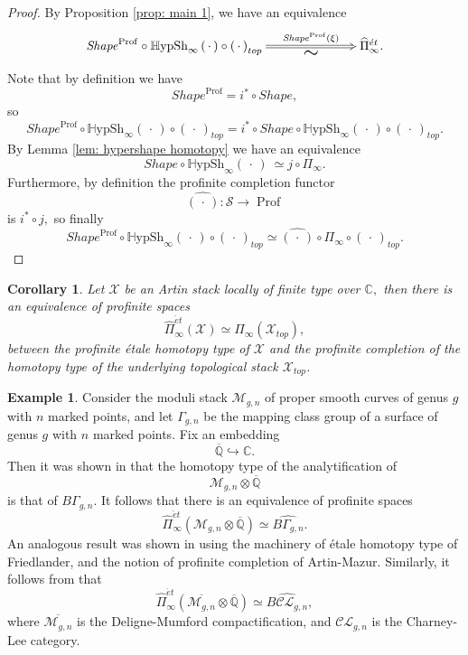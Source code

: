 \documentclass[12pt]{amsart}
\newtheorem{corollary}[dummy]{Corollary}
\theoremstyle{definition}
\newtheorem{example}[dummy]{Example}
\newcommand{\bC}{\mathbb{C}}
\newcommand{\cS}{\mathcal{S}}
\newcommand{\cX}{\mathcal{X}}
\newcommand{\et}{\acute{e}t}
\renewcommand{\i}{\infty}
\def\Hshi{\mathbb{H}\mathrm{ypSh}_\i}
\def\blank{\mspace{3mu}\cdot\mspace{3mu}}
\def\Prof{\operatorname{Prof}}
\def\Shape{\mathit{Shape}}
\begin{document}
\begin{proof}
By Proposition \ref{prop: main 1}, we have an equivalence
$$\xymatrix@C=2.5cm{\Shape^{\Prof} \circ \Hshi\left(\blank\right)\circ \left(\blank\right)_{top}  \ar@{=>}[r]^-{\Shape^{\Prof}\left(\xi\right)}_-{\mbox{\resizebox{!}{0.08in}{$\sim$}}}& \widehat{\Pi}^{\et}_\i.}$$ Note that by definition we have 
$$\Shape^{\Prof}= i^* \circ \Shape,$$ so  
$$Shape^{\Prof} \circ \Hshi\left(\blank\right)\circ \left(\blank\right)_{top}=i^* \circ Shape \circ \Hshi\left(\blank\right)\circ \left(\blank\right)_{top}.$$ By Lemma \ref{lem: hypershape homotopy} we have an equivalence $$Shape \circ \Hshi\left(\blank\right)\ \simeq j \circ \Pi_\i.$$ Furthermore, by definition the profinite completion functor $$\widehat{\left(\blank\right)}:\cS \to \Prof$$ is $i^* \circ j,$ so finally 
$$\Shape^{\Prof} \circ \Hshi\left(\blank\right)\circ \left(\blank\right)_{top}\simeq \widehat{\left(\blank\right)} \circ \Pi_\i \circ \left(\blank\right)_{top}.$$
\end{proof}

\begin{corollary} \label{cor: main}
Let $\cX$ be an Artin stack locally of finite type over $\bC,$ then there is an equivalence of profinite spaces $$\widehat{\Pi}^{\et}_\i\left(\cX\right) \simeq \widehat{\Pi}_\i\left(\cX_{top}\right),$$ between the profinite \'etale homotopy type of $\cX$ and the profinite completion of the homotopy type of the underlying topological stack $\cX_{top}$.
\end{corollary}


\begin{example}
Consider the moduli stack $\mathcal{M}_{g,n}$ of proper smooth curves of genus $g$ with $n$ marked points, and let $\Gamma_{g,n}$ be the mapping class group of a surface of genus $g$ with $n$ marked points. Fix an embedding $$\overline{\mathbb{Q}}\hookrightarrow \mathbb{C}.$$ Then it was shown in \cite{Oda} that the homotopy type of the analytification of $$\mathcal{M}_{g,n} \otimes \overline{\mathbb{Q}}$$ is that of $B\Gamma_{g,n}.$ It follows that there is an equivalence of profinite spaces $$\widehat{\Pi}^{\et}_\i\left(\mathcal{M}_{g,n} \otimes \overline{\mathbb{Q}}\right) \simeq \widehat{B\Gamma_{g,n}}.$$ An analogous result was shown in \cite{Oda} using the machinery of \'etale homotopy type of Friedlander, and the notion of profinite completion of Artin-Mazur. Similarly, it follows from \cite{compact} that $$\widehat{\Pi}^{\et}_\i\left(\overline{\mathcal{M}_{g,n}} \otimes \overline{\mathbb{Q}}\right) \simeq \widehat{B\mathcal{CL}_{g,n}},$$ where $\overline{\mathcal{M}_{g,n}}$ is the Deligne-Mumford compactification, and $\mathcal{CL}_{g,n}$ is the Charney-Lee category.
\end{example}
\end{document}

